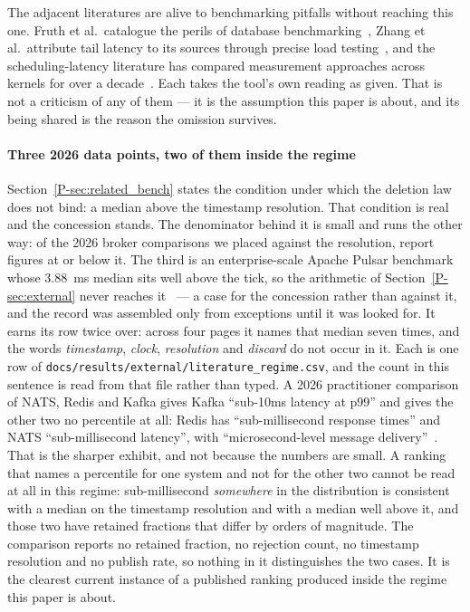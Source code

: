 \documentclass[10pt,journal,onecolumn]{IEEEtran}
\newcommand{\kafka}{Kafka}
\newcommand{\redis}{Redis}
\newcommand{\mainRelatedBench}{\ref{P-sec:related_bench}}   %
\newcommand{\mainModeB}{\ref{P-sec:external}}              %
\begin{document}
The adjacent literatures are alive to benchmarking pitfalls without reaching this one. Fruth
et al.\ catalogue the perils of database benchmarking~\cite{fruth2021telltale}, Zhang et al.\
attribute tail latency to its sources through precise load
testing~\cite{zhang2016treadmill}, and the scheduling-latency literature has compared
measurement approaches across kernels for over a decade~\cite{cerqueira2013comparison}. Each
takes the tool's own reading as given. That is not a criticism of any of them --- it is
the assumption this paper is about, and its being shared is the reason the omission survives.

\paragraph{Three 2026 data points, two of them inside the regime}
Section~\mainRelatedBench{} states the condition under which the deletion law does not bind: a median above
the timestamp resolution. That condition is real and the concession stands. The denominator
behind it is small and runs the other way: of the
\litComparisonsWord{} 2026 broker comparisons we placed
against the resolution, \litInsideRegimeWord{} report figures at or below it. The third is
an enterprise-scale Apache Pulsar benchmark whose $3.88$~ms median sits well above the tick, so
the arithmetic of Section~\mainModeB{} never reaches it~\cite{mukkolakkal2026pulsar} --- a case
for the concession rather than against it, and the record was assembled only from exceptions
until it was looked for. It earns its row twice over: across four pages it names that median
seven times, and the words \emph{timestamp}, \emph{clock}, \emph{resolution} and
\emph{discard} do not occur in it. Each is one row of
\texttt{docs/results/external/literature\_regime.csv}, and the count in this sentence is
read from that file rather than typed. A 2026 practitioner comparison of NATS, \redis{} and \kafka{} gives
\kafka{} ``sub-10ms latency at p99'' and gives the other two no percentile at all:
\redis{} has ``sub-millisecond response times'' and NATS ``sub-millisecond latency'',
with ``microsecond-level message delivery''~\cite{indexdev2026brokers}. That is the sharper
exhibit, and not because the numbers are small. A ranking that names a percentile for one
system and not for the other two cannot be read at all in this regime: sub-millisecond
\emph{somewhere} in the distribution is consistent with a median on the timestamp resolution and with a
median well above it, and those two have retained fractions that differ by orders of
magnitude. The comparison reports no retained fraction, no rejection count, no timestamp
resolution and no publish rate, so nothing in it distinguishes the two cases. It is the clearest
current instance of a published ranking produced inside the regime this paper is about.
\end{document}
